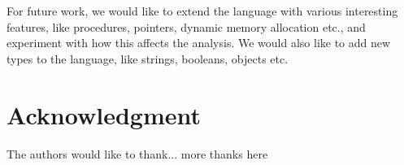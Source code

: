 \documentclass[10pt, conference, compsocconf]{IEEEtran}
\begin{document}
For future work, we would like to extend the language with various interesting features, like procedures, pointers, dynamic memory allocation etc., and experiment with how this affects the analysis.
We would also like to add new types to the language, like strings, booleans, objects etc.

\section*{Acknowledgment}


The authors would like to thank...
more thanks here


\end{document}
